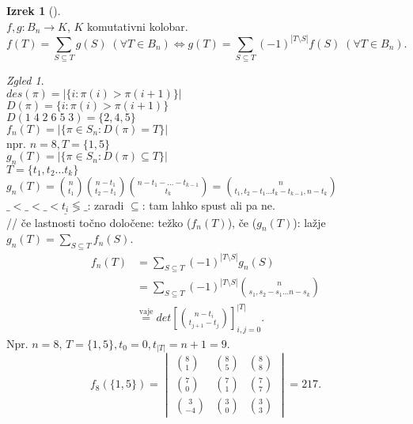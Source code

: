 \documentclass[a4paper, 12pt]{book}
\theoremstyle{definition}
\newtheorem{theorem}[counter]{Izrek}
\theoremstyle{remark}
\newtheorem*{exmp}{Zgled}
\begin{document}
\begin{theorem}[] \text{} \\
  $f, g: B_n \to K$, $K$ komutativni kolobar.
  \begin{equation*}f(T) = \sum_{S \subseteq T} g(S) \; (\forall T \in B_n) \iff
    g(T) = \sum_{S \subseteq T} (-1)^{|T \setminus S|} f(S) \; (\forall T \in B_n).
  \end{equation*}
\end{theorem}
\begin{exmp} \text{} \\
  $des(\pi) = |\{i : \pi(i) > \pi(i+1)\}|$ \\
  $D(\pi) = \{i : \pi(i) > \pi(i+1)\}$ \\
  $D(1\;4\;2\;6\;5\;3) = \{2,4,5\}$ \\
  $f_n(T) = |\{\pi \in S_n: D(\pi) = T\}|$ \\
  npr. $n=8, T=\{1,5\}$ \\
  $g_n(T) = |\{\pi \in S_n: D(\pi) \subseteq T\}|$ \\
  $T = \{t_1, t_2 \dots t_k\}$ \\
  $g_n(T) = \binom{n}{t_1} \binom{n-t_1}{t_2-t_1} \binom{n-t_1-\dots-t_{k-1}}{t_k}
    = \binom{n}{t_1,t_2-t_1 \dots t_k-t_{k-1}, n-t_k}$ \\
  $\_ < \_ < \_ < \underline{t_i} \lessgtr \_$: zaradi $\subseteq$: tam lahko spust ali pa ne. \\
  // če lastnosti točno določene: težko ($f_n(T)$), če  ($g_n(T)$): lažje \\
  $g_n(T) = \sum_{S \subseteq T} f_n(S)$.
  \begin{align*}
    f_n(T) &= \sum_{S \subseteq T} (-1)^{|T \setminus S|} g_n(S) \\
    &= \sum_{S \subseteq T} (-1)^{|T \setminus S|} \binom{n}{s_1, s_2-s_1 \dots n-s_k} \\
    &\stackrel{\text{vaje}}{=} det\left[\binom{n-t_i}{t_{j+1}-t_j}\right]_{i,j=0}^{|T|}.
  \end{align*}
  Npr. $n=8$, $T=\{1,5\}, t_0=0, t_{|T|}=n+1=9$.
  \begin{equation*}
    f_8(\{1,5\}) = \begin{vmatrix}
      \binom{8}{1} & \binom{8}{5} & \binom{8}{8} \\
      \binom{7}{0} & \binom{7}{1} & \binom{7}{7} \\
      \binom{3}{-4} & \binom{3}{0} & \binom{3}{3}
    \end{vmatrix} = 217.
  \end{equation*}
\end{exmp}
\end{document}

